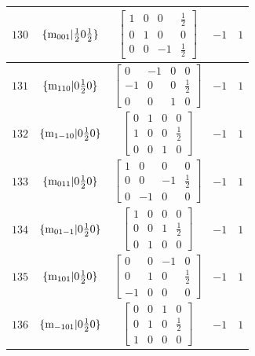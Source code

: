 \documentclass[fleqn,8pt]{jsarticle}
\begin{document}
\begin{longtable}{ccccc}
$ 130 $ & $ \{{\rm m}_{001}|\frac{1}{2} 0 \frac{1}{2}\} $ & $ \begin{bmatrix} 1 & 0 & 0 & \frac{1}{2} \\ 0 & 1 & 0 & 0 \\ 0 & 0 & -1 & \frac{1}{2} \end{bmatrix} $ & $ -1 $ & $ 1 $ \\ \hline
$ 131 $ & $ \{{\rm m}_{110}|0 \frac{1}{2} 0\} $ & $ \begin{bmatrix} 0 & -1 & 0 & 0 \\ -1 & 0 & 0 & \frac{1}{2} \\ 0 & 0 & 1 & 0 \end{bmatrix} $ & $ -1 $ & $ 1 $ \\ \hline
$ 132 $ & $ \{{\rm m}_{1-10}|0 \frac{1}{2} 0\} $ & $ \begin{bmatrix} 0 & 1 & 0 & 0 \\ 1 & 0 & 0 & \frac{1}{2} \\ 0 & 0 & 1 & 0 \end{bmatrix} $ & $ -1 $ & $ 1 $ \\ \hline
$ 133 $ & $ \{{\rm m}_{011}|0 \frac{1}{2} 0\} $ & $ \begin{bmatrix} 1 & 0 & 0 & 0 \\ 0 & 0 & -1 & \frac{1}{2} \\ 0 & -1 & 0 & 0 \end{bmatrix} $ & $ -1 $ & $ 1 $ \\ \hline
$ 134 $ & $ \{{\rm m}_{01-1}|0 \frac{1}{2} 0\} $ & $ \begin{bmatrix} 1 & 0 & 0 & 0 \\ 0 & 0 & 1 & \frac{1}{2} \\ 0 & 1 & 0 & 0 \end{bmatrix} $ & $ -1 $ & $ 1 $ \\ \hline
$ 135 $ & $ \{{\rm m}_{101}|0 \frac{1}{2} 0\} $ & $ \begin{bmatrix} 0 & 0 & -1 & 0 \\ 0 & 1 & 0 & \frac{1}{2} \\ -1 & 0 & 0 & 0 \end{bmatrix} $ & $ -1 $ & $ 1 $ \\ \hline
$ 136 $ & $ \{{\rm m}_{-101}|0 \frac{1}{2} 0\} $ & $ \begin{bmatrix} 0 & 0 & 1 & 0 \\ 0 & 1 & 0 & \frac{1}{2} \\ 1 & 0 & 0 & 0 \end{bmatrix} $ & $ -1 $ & $ 1 $ \\ \hline

\end{longtable}
\end{document}
